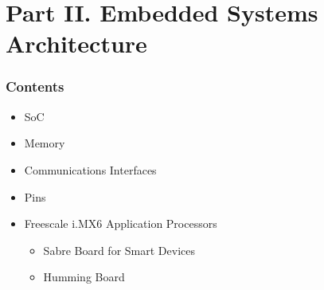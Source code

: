 \section{Part II. Embedded Systems Architecture}

\begin{frame}
  \frametitle{Contents}
  \begin{itemize}
  \item SoC
  \item Memory
  \item Communications Interfaces
  \item Pins
  \item Freescale i.MX6 Application Processors
    \begin{itemize}
    \item Sabre Board for Smart Devices
    \item Humming Board
    \end{itemize}
  \end{itemize}
\end{frame}
